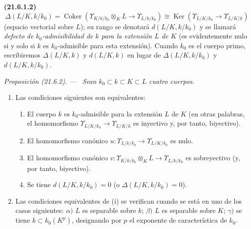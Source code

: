 \documentclass[10pt,oneside]{book}
\makeatletter
\newcommand{\setmanualcurrentlabel}[1]{\def\@currentlabel{#1}}
\newenvironment{env}[1][]{\setmanualcurrentlabel{#1}\par\medskip\noindent\textbf{(#1)}\ }{\par}
\newenvironment{proposition}[1][]{%
  \setmanualcurrentlabel{#1}\par\medskip\noindent\itshape Proposición (#1). ---\ }{\par}
\makeatother
\begin{document}
\begin{env}[21.6.1.2]
\label{0.21.6.1.2-es}
\[
\Delta(L/K,k/k_0)=\operatorname{Coker}
(\Upsilon_{K/k/k_0}\otimes_KL\to\Upsilon_{L/k/k_0})
\cong\operatorname{Ker}(\Upsilon_{L/K/k_0}\to\Upsilon_{L/K/k})
\]
(espacio vectorial sobre $L$); su rango se denotará $d(L/K,k/k_0)$ y se llamará
\emph{defecto de $k_0$-admisibilidad de $k$ para la extensión $L$ de $K$}
(es evidentemente nulo si y solo si $k$ es $k_0$-admisible para esta
extensión). Cuando $k_0$ es el cuerpo primo, escribiremos
$\Delta(L/K,k)$ y $d(L/K,k)$ en lugar de $\Delta(L/K,k/k_0)$ y
$d(L/K,k/k_0)$.
\end{env}

\begin{proposition}[21.6.2]
\label{0.21.6.2-es}
Sean $k_0\subset k\subset K\subset L$ cuatro cuerpos.
\begin{enumerate}
  \item[\rm (i)] Las condiciones siguientes son equivalentes:
  \begin{enumerate}
    \item[\rm a)] El cuerpo $k$ es $k_0$-admisible para la extensión $L$ de $K$
    (en otras palabras, el homomorfismo $\Upsilon_{L/K/k_0}\to
    \Upsilon_{L/K/k}$ es inyectivo y, por tanto, biyectivo).
    \item[\rm b)] El homomorfismo canónico
    $u:\Upsilon_{L/k/k_0}\to\Upsilon_{L/K/k_0}$ es nulo.
    \item[\rm c)] El homomorfismo canónico
    $v:\Upsilon_{K/k/k_0}\otimes_KL\to\Upsilon_{L/k/k_0}$ es sobreyectivo
    (y, por tanto, biyectivo).
    \item[\rm d)] Se tiene $d(L/K,k/k_0)=0$ (o
    $\Delta(L/K,k/k_0)=0$).
  \end{enumerate}
  \item[\rm (ii)] Las condiciones equivalentes de \textup{(i)} se verifican cuando
  se está en uno de los casos siguientes: $\alpha)$ $L$ es separable sobre $k$;
  $\beta)$ $L$ es separable sobre $K$; $\gamma)$ se tiene
  $k\subset k_0(K^p)$, designando por $p$ el exponente de característica de $k_0$.
\end{enumerate}
\end{proposition}
\end{document}

